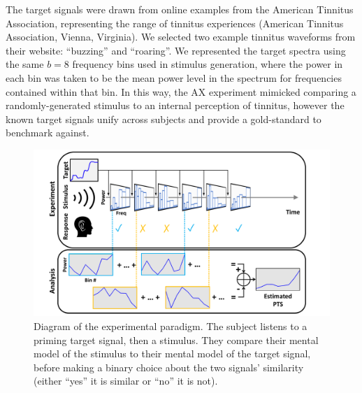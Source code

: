 \documentclass[journal]{IEEEtran}
\begin{document}
The target signals were drawn from online examples
from the American Tinnitus Association,
representing the range of tinnitus experiences
(American Tinnitus Association, Vienna, Virginia).
We selected two example tinnitus waveforms from their website: ``buzzing'' and ``roaring''.
We represented the target spectra using the same $b=8$ frequency bins used in stimulus generation,
where the power in each bin was taken to be the mean power level in the spectrum
for frequencies contained within that bin.
In this way, the AX experiment mimicked
comparing a randomly-generated stimulus to an internal perception of tinnitus,
however the known target signals
unify across subjects and provide a gold-standard to benchmark against.

\begin{figure}[t]
    \centering
    \includegraphics[width=\linewidth]{experiment_overview.pdf}
    \caption{Diagram of the experimental paradigm. The subject listens to a priming target signal,
  then a stimulus. They compare their mental model of the stimulus to their mental model of the target signal,
  before making a binary choice about the two signals' similarity (either ``yes'' it is similar or ``no'' it is not).}
    \label{fig:experimentdiagram}
\end{figure}


\end{document}
